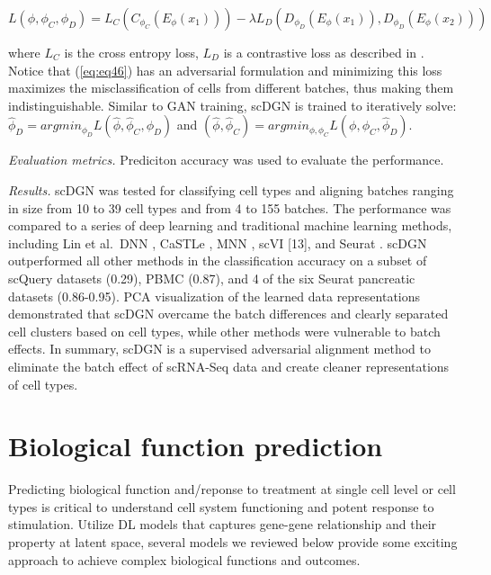 \documentclass[
]{book}
\begin{document}
\begin{equation}
    L(\phi,\phi_{C},\phi_{D}) = L_{C}(C_{\phi_{C}}(E_{\phi}(x_{1}))) - \lambda L_{D}(D_{\phi_{D}}(E_{\phi}(x_{1})), D_{\phi_{D}}(E_{\phi}(x_{2})))  \label{eq:eq46}
\end{equation}

where \(L_{C}\) is the cross entropy loss, \(L_{D}\) is a contrastive loss as described in \citep{RN244}. Notice that (\eqref{eq:eq46}) has an adversarial formulation and minimizing this loss maximizes the misclassification of cells from different batches, thus making them indistinguishable. Similar to GAN training, scDGN is trained to iteratively solve: \(\widehat{\phi}_{D} = argmin_{\phi_{D}}L(\widehat{\phi},\widehat{\phi}_{C},\phi_{D})\) and \((\widehat{\phi},\widehat{\phi}_{C} ) = argmin_{\phi,\phi_{C}}L(\phi,\phi_{C}, \widehat{\phi}_{D})\).

\emph{Evaluation metrics.} Prediciton accuracy was used to evaluate the performance.

\emph{Results.} scDGN was tested for classifying cell types and aligning batches ranging in size from 10 to 39 cell types and from 4 to 155 batches. The performance was compared to a series of deep learning and traditional machine learning methods, including Lin et al.~DNN \citep{RN193}, CaSTLe \citep{RN194}, MNN \citep{RN84}, scVI \citep{RN88}{[}13{]}, and Seurat \citep{RN96}. scDGN outperformed all other methods in the classification accuracy on a subset of scQuery datasets (0.29), PBMC (0.87), and 4 of the six Seurat pancreatic datasets (0.86-0.95). PCA visualization of the learned data representations demonstrated that scDGN overcame the batch differences and clearly separated cell clusters based on cell types, while other methods were vulnerable to batch effects. In summary, scDGN is a supervised adversarial alignment method to eliminate the batch effect of scRNA-Seq data and create cleaner representations of cell types.

\hypertarget{ch-5-7}{%
\section{Biological function prediction}\label{ch-5-7}}

Predicting biological function and/reponse to treatment at single cell level or cell types is critical to understand cell system functioning and potent response to stimulation. Utilize DL models that captures gene-gene relationship and their property at latent space, several models we reviewed below provide some exciting approach to achieve complex biological functions and outcomes.
\end{document}
